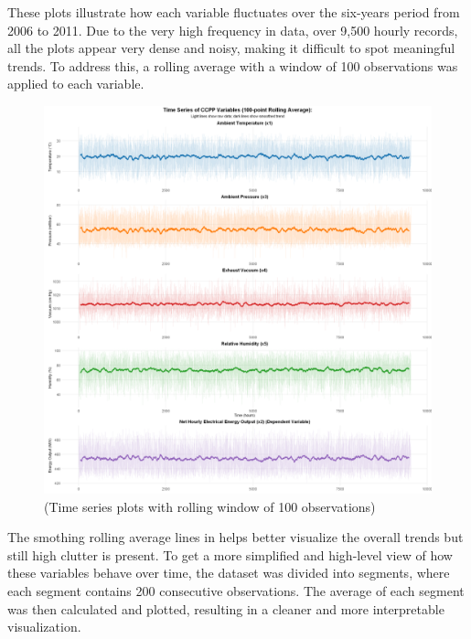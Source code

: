\documentclass[12pt,a4paper]{article}
\begin{document}

These plots illustrate how each variable fluctuates over the six-years 
period from 2006 to 2011. Due to the very high frequency in data, over 9,500 hourly records, 
all the plots appear very dense and noisy, 
making it difficult to spot meaningful trends. To address this, a rolling 
average with a window of 100 observations was applied to each variable. %

\begin{figure}[H]
    \centering
    \includegraphics[width=\textwidth]{z4.png}
    \caption{(Time series plots with rolling window of 100 observations)}
    \label{fig:time_series2}
\end{figure}


The smothing rolling average lines in helps better visualize the overall trends 
but still high clutter is present. %
To get a more simplified and high-level view of how these variables 
behave over time, the dataset was divided into segments, 
where each segment contains 200 consecutive observations. 
The average of each segment was then calculated and plotted, 
resulting in a cleaner and more interpretable visualization. 
\end{document}
